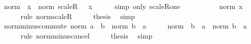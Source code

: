 \begin{isabellebody}
\ {\isachardoublequoteopen}norm\ {\isacharparenleft}{\kern0pt}{\isacharminus}{\kern0pt}\ x{\isacharparenright}{\kern0pt}\ {\isacharequal}{\kern0pt}\ norm\ {\isacharparenleft}{\kern0pt}scaleR\ {\isacharparenleft}{\kern0pt}{\isacharminus}{\kern0pt}\ {}{\isacharparenright}{\kern0pt}\ x{\isacharparenright}{\kern0pt}{\isachardoublequoteclose}\isanewline
\ \ \ \ \isamarkupfalse%
\ {\isacharparenleft}{\kern0pt}simp\ only{\isacharcolon}{\kern0pt}\ scaleR{\isacharunderscore}{\kern0pt}one{\isacharparenright}{\kern0pt}\isanewline
\ \ \isamarkupfalse%
\ \isamarkupfalse%
\ {\isachardoublequoteopen}{\isasymdots}\ {\isacharequal}{\kern0pt}\ {\isasymbar}{\isacharminus}{\kern0pt}\ {}{\isasymbar}\ {\isacharasterisk}{\kern0pt}\ norm\ x{\isachardoublequoteclose}\isanewline
\ \ \ \ \isamarkupfalse%
\ {\isacharparenleft}{\kern0pt}rule\ norm{\isacharunderscore}{\kern0pt}scaleR{\isacharparenright}{\kern0pt}\isanewline
\ \ \isamarkupfalse%
\ \isamarkupfalse%
\ {\isacharquery}{\kern0pt}thesis\ \isamarkupfalse%
\ simp\isanewline
{}\isamarkupfalse%
%
\endisatagproof
{\isafoldproof}%
%
\isadelimproof
\isanewline
%
\endisadelimproof
\isanewline
{}\isamarkupfalse%
\ norm{\isacharunderscore}{\kern0pt}minus{\isacharunderscore}{\kern0pt}commute{\isacharcolon}{\kern0pt}\ {\isachardoublequoteopen}norm\ {\isacharparenleft}{\kern0pt}a\ {\isacharminus}{\kern0pt}\ b{\isacharparenright}{\kern0pt}\ {\isacharequal}{\kern0pt}\ norm\ {\isacharparenleft}{\kern0pt}b\ {\isacharminus}{\kern0pt}\ a{\isacharparenright}{\kern0pt}{\isachardoublequoteclose}\isanewline
%
\isadelimproof
%
\endisadelimproof
%
\isatagproof
{}\isamarkupfalse%
\ {\isacharminus}{\kern0pt}\isanewline
\ \ \isamarkupfalse%
\ {\isachardoublequoteopen}norm\ {\isacharparenleft}{\kern0pt}{\isacharminus}{\kern0pt}\ {\isacharparenleft}{\kern0pt}b\ {\isacharminus}{\kern0pt}\ a{\isacharparenright}{\kern0pt}{\isacharparenright}{\kern0pt}\ {\isacharequal}{\kern0pt}\ norm\ {\isacharparenleft}{\kern0pt}b\ {\isacharminus}{\kern0pt}\ a{\isacharparenright}{\kern0pt}{\isachardoublequoteclose}\isanewline
\ \ \ \ \isamarkupfalse%
\ {\isacharparenleft}{\kern0pt}rule\ norm{\isacharunderscore}{\kern0pt}minus{\isacharunderscore}{\kern0pt}cancel{\isacharparenright}{\kern0pt}\isanewline
\ \ \isamarkupfalse%
\ \isamarkupfalse%
\ {\isacharquery}{\kern0pt}thesis\ \isamarkupfalse%
\ simp\isanewline

\end{isabellebody}
